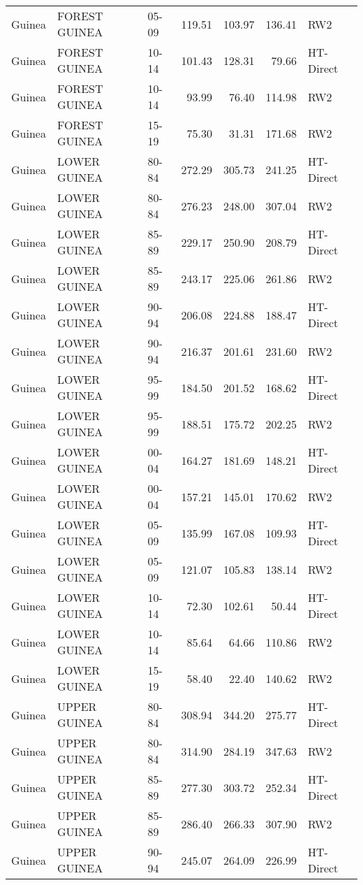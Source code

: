 \begin{longtable}{lllrrrl}
  Guinea & FOREST GUINEA & 05-09 & 119.51 & 103.97 & 136.41 & RW2 \\ 
  Guinea & FOREST GUINEA & 10-14 & 101.43 & 128.31 & 79.66 & HT-Direct \\ 
  Guinea & FOREST GUINEA & 10-14 & 93.99 & 76.40 & 114.98 & RW2 \\ 
  Guinea & FOREST GUINEA & 15-19 & 75.30 & 31.31 & 171.68 & RW2 \\ 
  Guinea & LOWER GUINEA & 80-84 & 272.29 & 305.73 & 241.25 & HT-Direct \\ 
  Guinea & LOWER GUINEA & 80-84 & 276.23 & 248.00 & 307.04 & RW2 \\ 
  Guinea & LOWER GUINEA & 85-89 & 229.17 & 250.90 & 208.79 & HT-Direct \\ 
  Guinea & LOWER GUINEA & 85-89 & 243.17 & 225.06 & 261.86 & RW2 \\ 
  Guinea & LOWER GUINEA & 90-94 & 206.08 & 224.88 & 188.47 & HT-Direct \\ 
  Guinea & LOWER GUINEA & 90-94 & 216.37 & 201.61 & 231.60 & RW2 \\ 
  Guinea & LOWER GUINEA & 95-99 & 184.50 & 201.52 & 168.62 & HT-Direct \\ 
  Guinea & LOWER GUINEA & 95-99 & 188.51 & 175.72 & 202.25 & RW2 \\ 
  Guinea & LOWER GUINEA & 00-04 & 164.27 & 181.69 & 148.21 & HT-Direct \\ 
  Guinea & LOWER GUINEA & 00-04 & 157.21 & 145.01 & 170.62 & RW2 \\ 
  Guinea & LOWER GUINEA & 05-09 & 135.99 & 167.08 & 109.93 & HT-Direct \\ 
  Guinea & LOWER GUINEA & 05-09 & 121.07 & 105.83 & 138.14 & RW2 \\ 
  Guinea & LOWER GUINEA & 10-14 & 72.30 & 102.61 & 50.44 & HT-Direct \\ 
  Guinea & LOWER GUINEA & 10-14 & 85.64 & 64.66 & 110.86 & RW2 \\ 
  Guinea & LOWER GUINEA & 15-19 & 58.40 & 22.40 & 140.62 & RW2 \\ 
  Guinea & UPPER GUINEA & 80-84 & 308.94 & 344.20 & 275.77 & HT-Direct \\ 
  Guinea & UPPER GUINEA & 80-84 & 314.90 & 284.19 & 347.63 & RW2 \\ 
  Guinea & UPPER GUINEA & 85-89 & 277.30 & 303.72 & 252.34 & HT-Direct \\ 
  Guinea & UPPER GUINEA & 85-89 & 286.40 & 266.33 & 307.90 & RW2 \\ 
  Guinea & UPPER GUINEA & 90-94 & 245.07 & 264.09 & 226.99 & HT-Direct \\ 

\end{longtable}

